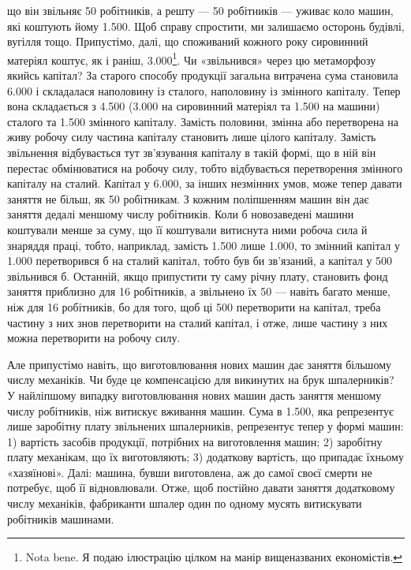 \parcont{}  %
що він звільняє 50 робітників, а решту — 50 робітників — уживає
коло машин, які коштують йому \num{1.500}. Щоб
справу спростити, ми залишаємо осторонь будівлі, вугілля тощо.
Припустімо, далі, що споживаний кожного року сировинний
матеріял коштує, як і раніш, \num{3.000}\footnote{
Nota bene. Я подаю ілюстрацію цілком на манір вищеназваних
економістів.
}. Чи «звільнився» через цю метаморфозу якийсь капітал? За старого
способу продукції загальна витрачена сума становила \num{6.000} і складалася наполовину із сталого, наполовину із
змінного капіталу. Тепер вона складається з \num{4.500}
(\num{3.000} на сировинний матеріял та \num{1.500} на машини) сталого та \num{1.500} змінного
капіталу. Замість половини, змінна або перетворена на живу робочу
силу частина капіталу становить лише  цілого капіталу. Замість
звільнення відбувається тут зв’язування капіталу в такій формі,
що в ній він перестає обмінюватися на робочу силу, тобто відбувається
перетворення змінного капіталу на сталий. Капітал у \num{6.000}, за інших незмінних умов, може тепер давати заняття
не більш, як 50 робітникам. З кожним поліпшенням машин він
дає заняття дедалі меншому числу робітників. Коли б новозаведені
машини коштували менше за суму, що її коштували витиснута
ними робоча сила й знаряддя праці, тобто, наприклад, замість
\num{1.500} лише \num{1.000}, то змінний
капітал у \num{1.000} перетворився б на сталий капітал,
тобто був би зв’язаний, а капітал у 500
звільнився б. Останній, якщо припустити ту саму річну плату,
становить фонд заняття приблизно для 16 робітників, а звільнено
їх 50 — навіть багато менше, ніж для 16 робітників, бо для того,
щоб ці 500 перетворити на капітал, треба частину
з них знов перетворити на сталий капітал, і отже, лише частину
з них можна перетворити на робочу силу.

Але припустімо навіть, що виготовлювання нових машин дає
заняття більшому числу механіків. Чи буде це компенсацією
для викинутих на брук шпалерників? У найліпшому випадку
виготовлювання нових машин дасть заняття меншому числу
робітників, ніж витискує вживання машин. Сума в \num{1.500}, яка репрезентує лише заробітну плату звільнених
шпалерників, репрезентує тепер у формі машин: 1) вартість засобів
продукції, потрібних на виготовлення машин; 2) заробітну
плату механікам, що їх виготовляють; 3) додаткову вартість, що
припадає їхньому «хазяїнові». Далі: машина, бувши виготовлена,
аж до самої своєї смерти не потребує, щоб її відновлювали. Отже,
щоб постійно давати заняття додатковому числу механіків, фабриканти
шпалер один по одному мусять витискувати робітників
машинами.

